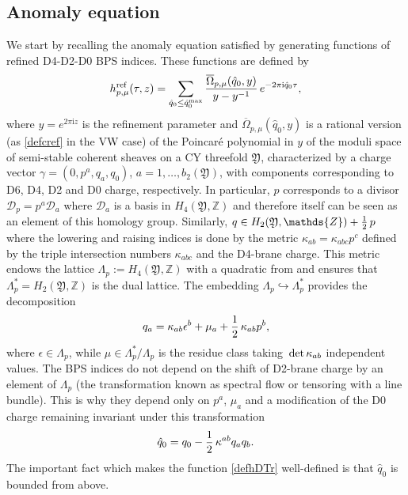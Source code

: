 \documentclass[12pt,letterpaper]{JHEP3}
\def\be{\begin{equation}}
\def\ee{\end{equation}}
\def\det{\,{\rm det}\, }
\def\hf{{1\over 2}}
\newcommand{\eps}{\epsilon}
\newcommand{\I}{\mathrm{i}}
\newcommand{\cD}{\mathcal{D}}
\newcommand{\IZ}{\mathds{Z}}
\def\bOm{\overline\Omega}
\def\hq{\hat q}
\def\CY{\mathfrak{Y}}
\def\hr{h^{\rm ref}}
\begin{document}
\subsection{Anomaly equation}
\label{subsec-anomeq}

We start by recalling the anomaly equation satisfied by generating functions of refined D4-D2-D0 BPS indices.
These functions are defined by
\be 
\hr_{p,\mu}(\tau,z) = \sum_{\hq_0 \leq \hq_0^{\rm max}}
\frac{\bOm_{p,\mu}(\hq_0,y)}{y-y^{-1}}\,e^{-2\pi\I \hq_0 \tau },
\label{defhDTr}
\ee 
where $y=e^{2\pi\I z}$ is the refinement parameter and $\bOm_{p,\mu}(\hq_0,y)$ is a rational version (as \eqref{defcref} in the VW case)
of the Poincar\'e polynomial in $y$ of the moduli space of semi-stable coherent sheaves on a CY threefold $\CY$,
characterized by a charge vector $\gamma=(0,p^a,q_a,q_0)$, $a=1,\dots, b_2(\CY)$, with components corresponding 
to D6, D4, D2 and D0 charge, respectively. In particular, $p$ corresponds to a divisor $\cD_p=p^a\cD_a$ where $\cD_a$
is a basis in $H_4(\CY,\IZ)$ and therefore itself can be seen as an element of this homology group.
Similarly, $q\in H_2(\CY,\IZ)+\hf\, p$
where the lowering and raising indices is done by the metric $\kappa_{ab}=\kappa_{abc}p^c$
defined by the triple intersection numbers $\kappa_{abc}$ and the D4-brane charge.
This metric endows the lattice $\Lambda_p:=H_4(\CY,\IZ)$ with a quadratic from and ensures that $\Lambda_p^*=H_2(\CY,\IZ)$ is the dual lattice.
The embedding $\Lambda_p\hookrightarrow \Lambda_p^*$ provides the decomposition 
\be
q_a=\kappa_{ab}\eps^b +\mu_a+\hf\,\kappa_{ab}p^b,
\label{decomp-spfl}
\ee 
where $\eps\in\Lambda_p$, while $\mu\in \Lambda_p^*/\Lambda_p$ is the residue class 
taking $\det\kappa_{ab}$ independent values.
The BPS indices do not depend on the shift of D2-brane charge by an element of $\Lambda_p$ 
(the transformation known as spectral flow or tensoring with a line bundle). This is why they depend only on $p^a$, $\mu_a$
and a modification of the D0 charge remaining invariant under this transformation
\be
\hq_0=q_0-\hf\, \kappa^{ab}q_a q_b.
\label{def-hq0}
\ee 
The important fact which makes the function \eqref{defhDTr} well-defined is that $\hq_0$ is bounded from above.
\end{document}
